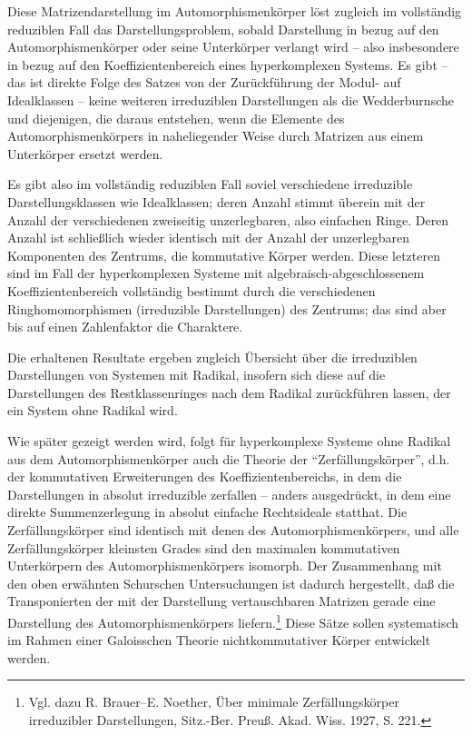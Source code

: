 \documentclass[11pt]{article}
\begin{document}
Diese Matrizendarstellung im Automorphismenkörper löst zugleich im vollständig reduziblen Fall das Darstellungsproblem, sobald Darstellung in bezug auf den Automorphismenkörper oder seine Unterkörper verlangt wird -- also insbesondere in bezug auf den Koeffizientenbereich eines hyperkomplexen Systems. Es gibt -- das ist direkte Folge des Satzes von der Zurückführung der Modul- auf Idealklassen -- keine weiteren irreduziblen Darstellungen als die Wedderburnsche und diejenigen, die daraus entstehen, wenn die Elemente des Automorphismenkörpers in naheliegender Weise durch Matrizen aus einem Unterkörper ersetzt werden.

Es gibt also im vollständig reduziblen Fall soviel verschiedene irreduzible Darstellungsklassen wie Idealklassen; deren Anzahl stimmt überein mit der Anzahl der verschiedenen zweiseitig unzerlegbaren, also einfachen Ringe. Deren Anzahl ist schließlich wieder identisch mit der Anzahl der unzerlegbaren Komponenten des Zentrums, die kommutative Körper werden. Diese letzteren sind im Fall der hyperkomplexen Systeme mit algebraisch-abgeschlossenem Koeffizientenbereich vollständig bestimmt durch die verschiedenen Ringhomomorphismen (irreduzible Darstellungen) des Zentrums; das sind aber bis auf einen Zahlenfaktor die Charaktere.

Die erhaltenen Resultate ergeben zugleich Übersicht über die irreduziblen Darstellungen von Systemen mit Radikal, insofern sich diese auf die Darstellungen des Restklassenringes nach dem Radikal zurückführen lassen, der ein System ohne Radikal wird.

Wie später gezeigt werden wird, folgt für hyperkomplexe Systeme ohne Radikal aus dem Automorphismenkörper auch die Theorie der ``Zerfällungskörper'', d.h. der kommutativen Erweiterungen des Koeffizientenbereichs, in dem die Darstellungen in absolut irreduzible zerfallen -- anders ausgedrückt, in dem eine direkte Summenzerlegung in absolut einfache Rechtsideale statthat. Die Zerfällungskörper sind identisch mit denen des Automorphismenkörpers, und alle Zerfällungskörper kleinsten Grades sind den maximalen kommutativen Unterkörpern des Automorphismenkörpers isomorph. Der Zusammenhang mit den oben erwähnten Schurschen Untersuchungen ist dadurch hergestellt, daß die Transponierten der mit der Darstellung vertauschbaren Matrizen gerade eine Darstellung des Automorphismenkörpers liefern.\footnote{Vgl. dazu R. Brauer--E. Noether, Über minimale Zerfällungskörper irreduzibler Darstellungen, Sitz.-Ber. Preuß. Akad. Wiss. 1927, S. 221.} Diese Sätze sollen systematisch im Rahmen einer Galoisschen Theorie nichtkommutativer Körper entwickelt werden.
\end{document}
